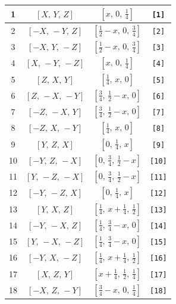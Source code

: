 \documentclass[fleqn,8pt]{jsarticle}
\begin{document}
\begin{longtable}{cccc}
1 & $\left[ X,\, Y,\, Z \right]$ & $\left[ x,\, 0,\, \frac{1}{4} \right]$ & {\tt [1]} \\ \hline
2 & $\left[ - X,\, - Y,\, Z \right]$ & $\left[ \frac{1}{2} - x,\, 0,\, \frac{3}{4} \right]$ & {\tt [2]} \\ \hline
3 & $\left[ - X,\, Y,\, - Z \right]$ & $\left[ \frac{1}{2} - x,\, 0,\, \frac{3}{4} \right]$ & {\tt [3]} \\ \hline
4 & $\left[ X,\, - Y,\, - Z \right]$ & $\left[ x,\, 0,\, \frac{1}{4} \right]$ & {\tt [4]} \\ \hline
5 & $\left[ Z,\, X,\, Y \right]$ & $\left[ \frac{1}{4},\, x,\, 0 \right]$ & {\tt [5]} \\ \hline
6 & $\left[ Z,\, - X,\, - Y \right]$ & $\left[ \frac{3}{4},\, \frac{1}{2} - x,\, 0 \right]$ & {\tt [6]} \\ \hline
7 & $\left[ - Z,\, - X,\, Y \right]$ & $\left[ \frac{3}{4},\, \frac{1}{2} - x,\, 0 \right]$ & {\tt [7]} \\ \hline
8 & $\left[ - Z,\, X,\, - Y \right]$ & $\left[ \frac{1}{4},\, x,\, 0 \right]$ & {\tt [8]} \\ \hline
9 & $\left[ Y,\, Z,\, X \right]$ & $\left[ 0,\, \frac{1}{4},\, x \right]$ & {\tt [9]} \\ \hline
10 & $\left[ - Y,\, Z,\, - X \right]$ & $\left[ 0,\, \frac{3}{4},\, \frac{1}{2} - x \right]$ & {\tt [10]} \\ \hline
11 & $\left[ Y,\, - Z,\, - X \right]$ & $\left[ 0,\, \frac{3}{4},\, \frac{1}{2} - x \right]$ & {\tt [11]} \\ \hline
12 & $\left[ - Y,\, - Z,\, X \right]$ & $\left[ 0,\, \frac{1}{4},\, x \right]$ & {\tt [12]} \\ \hline
13 & $\left[ Y,\, X,\, Z \right]$ & $\left[ \frac{1}{4},\, x + \frac{1}{4},\, \frac{1}{2} \right]$ & {\tt [13]} \\ \hline
14 & $\left[ - Y,\, - X,\, Z \right]$ & $\left[ \frac{1}{4},\, \frac{3}{4} - x,\, 0 \right]$ & {\tt [14]} \\ \hline
15 & $\left[ Y,\, - X,\, - Z \right]$ & $\left[ \frac{1}{4},\, \frac{3}{4} - x,\, 0 \right]$ & {\tt [15]} \\ \hline
16 & $\left[ - Y,\, X,\, - Z \right]$ & $\left[ \frac{1}{4},\, x + \frac{1}{4},\, \frac{1}{2} \right]$ & {\tt [16]} \\ \hline
17 & $\left[ X,\, Z,\, Y \right]$ & $\left[ x + \frac{1}{4},\, \frac{1}{2},\, \frac{1}{4} \right]$ & {\tt [17]} \\ \hline
18 & $\left[ - X,\, Z,\, - Y \right]$ & $\left[ \frac{3}{4} - x,\, 0,\, \frac{1}{4} \right]$ & {\tt [18]} \\ \hline

\end{longtable}
\end{document}

